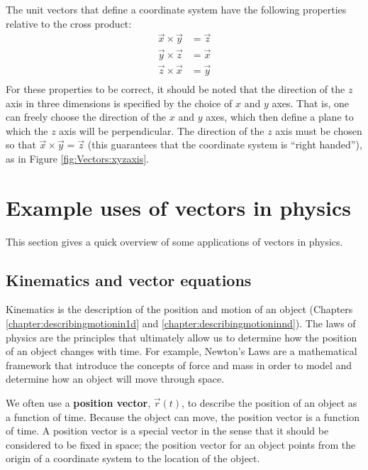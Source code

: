 
The unit vectors that define a coordinate system have the following properties relative to the cross product:
\begin{align*}
\vec x \times \vec y &= \vec z\\
\vec y \times \vec z &= \vec x\\
\vec z \times \vec x &= \vec y\\
\end{align*}
For these properties to be correct, it should be noted that the direction of the $z$ axis in three dimensions is specified by the choice of $x$ and $y$ axes. That is, one can freely choose the direction of the $x$ and $y$ axes, which then define a plane to which the $z$ axis will be perpendicular. The direction of the $z$ axis must be chosen so that $\vec x \times \vec y = \vec z$ (this guarantees that the coordinate system is ``right handed''), as in Figure \ref{fig:Vectors:xyzaxis}.

\section{Example uses of vectors in physics}
This section gives a quick overview of some applications of vectors in physics.
\subsection{Kinematics and vector equations}
Kinematics is the description of the position and motion of an object (Chapters \ref{chapter:describingmotionin1d} and \ref{chapter:describingmotioninnd}). The laws of physics are the principles that ultimately allow us to determine how the position of an object changes with time. For example, Newton's Laws are a mathematical framework that introduce the concepts of force and mass in order to model and determine how an object will move through space.

We often use a \textbf{position vector}, $\vec r(t)$, to describe the position of an object as a function of time. Because the object can move, the position vector is a function of time. A position vector is a special vector in the sense that it should be considered to be fixed in space; the position vector for an object points from the origin of a coordinate system to the location of the object. 

